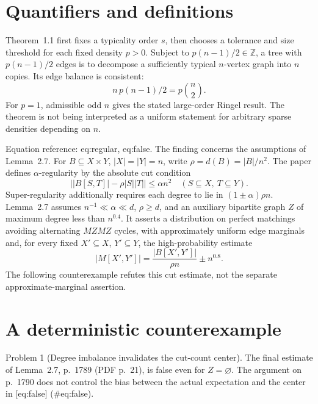 \documentclass[10pt]{article}
\begin{document}
\section*{Quantifiers and definitions}
Theorem 1.1 first fixes a typicality order \(s\), then chooses a tolerance and size threshold for each fixed density \(p>0\). Subject to \(p(n-1)/2\in\mathbb Z\), a tree with \(p(n-1)/2\) edges is to decompose a sufficiently typical \(n\)-vertex graph into \(n\) copies. Its edge balance is consistent: \[n\,p(n-1)/2=p\binom n2.\] For \(p=1\), admissible odd \(n\) gives the stated large-order Ringel result. The theorem is not being interpreted as a uniform statement for arbitrary sparse densities depending on \(n\).\par
Equation reference: eq:regular, eq:false. The finding concerns the assumptions of Lemma 2.7. For \(B\subseteq X\times Y\), \(|X|=|Y|=n\), write \(\rho=d(B)=|B|/n^2\). The paper defines \(\alpha\)-regularity by the absolute cut condition \[
 \bigl||B[S,T]|-\rho|S||T|\bigr|\leq\alpha n^2
 \quad(S\subseteq X,\ T\subseteq Y).\] Super-regularity additionally requires each degree to lie in \((1\pm\alpha)\rho n\). Lemma 2.7 assumes \(n^{-1}\ll\alpha\ll d\), \(\rho\geq d\), and an auxiliary bipartite graph \(Z\) of maximum degree less than \(n^{0.4}\). It asserts a distribution on perfect matchings avoiding alternating \(MZMZ\) cycles, with approximately uniform edge marginals and, for every fixed \(X'\subseteq X\), \(Y'\subseteq Y\), the high-probability estimate \[
 |M[X',Y']|=\frac{|B[X',Y']|}{\rho n}\pm n^{0.8}.\] The following counterexample refutes this cut estimate, not the separate approximate-marginal assertion.\par
\section*{A deterministic counterexample}
Problem 1 (Degree imbalance invalidates the cut-count center).  The final estimate of Lemma 2.7, p. 1789 (PDF p. 21), is false even for \(Z=\varnothing\). The argument on p. 1790 does not control the bias between the actual expectation and the center in [eq:false] (\#eq:false).\par
\end{document}
